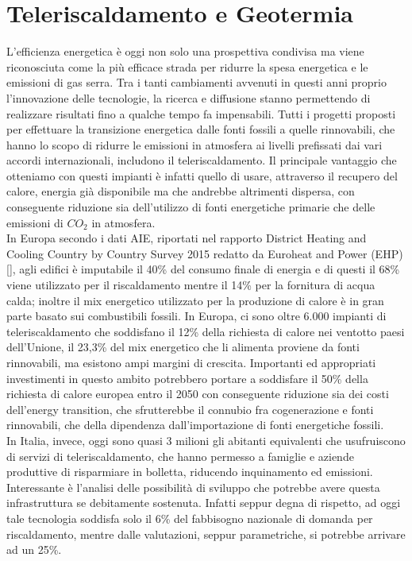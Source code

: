 \documentclass[laurea,oneside,11pt]{USiena_tesiLM}
\begin{document}
\chapter{Teleriscaldamento e Geotermia}
L'efficienza energetica è oggi non solo una prospettiva condivisa ma viene riconosciuta come la più efficace strada per ridurre la spesa energetica e le emissioni di gas serra. Tra i tanti cambiamenti avvenuti in questi anni proprio l'innovazione delle tecnologie, la ricerca e diffusione stanno permettendo di realizzare risultati fino a qualche tempo fa impensabili. Tutti i progetti proposti per effettuare la transizione energetica dalle fonti fossili a quelle rinnovabili, che hanno lo scopo di ridurre le emissioni in atmosfera ai livelli prefissati dai vari accordi internazionali, includono il teleriscaldamento.
Il principale vantaggio che otteniamo con questi impianti è infatti quello di usare, attraverso il recupero del calore, energia già disponibile ma che andrebbe altrimenti dispersa, con conseguente riduzione sia dell'utilizzo di fonti energetiche primarie che delle emissioni di $CO_2$ in atmosfera.\\

In Europa secondo i dati AIE, riportati nel rapporto District Heating and Cooling Country by Country Survey 2015 redatto da Euroheat and Power (EHP) [\cite{heating2015cooling}], agli edifici è imputabile il 40\% del consumo finale di energia e di questi il 68\% viene utilizzato per il riscaldamento mentre il 14\% per la fornitura di acqua calda; inoltre il mix energetico utilizzato per la produzione di calore è in gran parte basato sui combustibili fossili. In Europa, ci sono oltre 6.000 impianti di teleriscaldamento che soddisfano il 12\% della richiesta di calore nei ventotto paesi dell'Unione, il 23,3\% del mix energetico che li alimenta proviene da fonti rinnovabili, ma esistono ampi margini di crescita. Importanti ed appropriati investimenti in questo ambito potrebbero portare a soddisfare il 50\% della richiesta di calore europea entro il 2050 con conseguente riduzione sia dei costi dell'energy transition, che sfrutterebbe il connubio fra cogenerazione e fonti rinnovabili, che della dipendenza dall'importazione di fonti energetiche fossili.\\

In Italia, invece, oggi sono quasi 3 milioni gli abitanti equivalenti che usufruiscono di servizi di teleriscaldamento, che hanno permesso a famiglie e aziende produttive di risparmiare in bolletta, riducendo inquinamento ed emissioni. 
Interessante è l'analisi delle possibilità di sviluppo che potrebbe avere questa infrastruttura se debitamente sostenuta. Infatti seppur degna di rispetto, ad oggi tale tecnologia soddisfa solo il 6\% del fabbisogno nazionale di domanda per riscaldamento, mentre dalle valutazioni, seppur parametriche, si potrebbe arrivare ad un 25\%.\\
\end{document}
